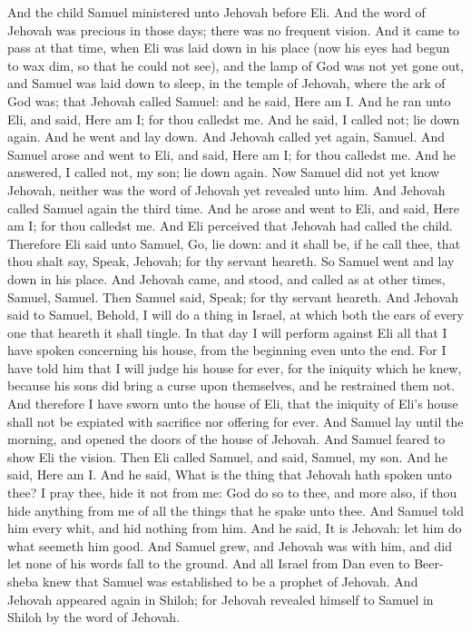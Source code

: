 And the child Samuel ministered unto Jehovah before Eli. And the word of Jehovah was precious in those days; there was no frequent vision. And it came to pass at that time, when Eli was laid down in his place (now his eyes had begun to wax dim, so that he could not see), and the lamp of God was not yet gone out, and Samuel was laid down to sleep, in the temple of Jehovah, where the ark of God was; that Jehovah called Samuel: and he said, Here am I. And he ran unto Eli, and said, Here am I; for thou calledst me. And he said, I called not; lie down again. And he went and lay down. And Jehovah called yet again, Samuel. And Samuel arose and went to Eli, and said, Here am I; for thou calledst me. And he answered, I called not, my son; lie down again. Now Samuel did not yet know Jehovah, neither was the word of Jehovah yet revealed unto him. And Jehovah called Samuel again the third time. And he arose and went to Eli, and said, Here am I; for thou calledst me. And Eli perceived that Jehovah had called the child. Therefore Eli said unto Samuel, Go, lie down: and it shall be, if he call thee, that thou shalt say, Speak, Jehovah; for thy servant heareth. So Samuel went and lay down in his place.  And Jehovah came, and stood, and called as at other times, Samuel, Samuel. Then Samuel said, Speak; for thy servant heareth. And Jehovah said to Samuel, Behold, I will do a thing in Israel, at which both the ears of every one that heareth it shall tingle. In that day I will perform against Eli all that I have spoken concerning his house, from the beginning even unto the end. For I have told him that I will judge his house for ever, for the iniquity which he knew, because his sons did bring a curse upon themselves, and he restrained them not. And therefore I have sworn unto the house of Eli, that the iniquity of Eli’s house shall not be expiated with sacrifice nor offering for ever.  And Samuel lay until the morning, and opened the doors of the house of Jehovah. And Samuel feared to show Eli the vision. Then Eli called Samuel, and said, Samuel, my son. And he said, Here am I. And he said, What is the thing that Jehovah hath spoken unto thee? I pray thee, hide it not from me: God do so to thee, and more also, if thou hide anything from me of all the things that he spake unto thee. And Samuel told him every whit, and hid nothing from him. And he said, It is Jehovah: let him do what seemeth him good.  And Samuel grew, and Jehovah was with him, and did let none of his words fall to the ground. And all Israel from Dan even to Beer-sheba knew that Samuel was established to be a prophet of Jehovah. And Jehovah appeared again in Shiloh; for Jehovah revealed himself to Samuel in Shiloh by the word of Jehovah. 

